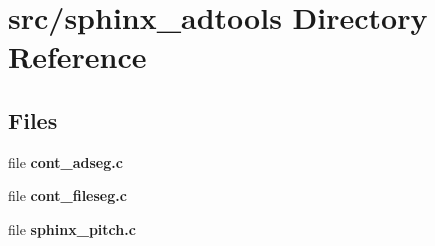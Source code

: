 \section{src/sphinx\-\_\-adtools Directory Reference}
\label{dir_626a4c20570d8d1011e4cc5b6ee6b8c0}
\subsection*{Files}
\begin{DoxyCompactItemize}
\item 
file {\bfseries cont\-\_\-adseg.\-c}
\item 
file {\bfseries cont\-\_\-fileseg.\-c}
\item 
file {\bfseries sphinx\-\_\-pitch.\-c}
\end{DoxyCompactItemize}
